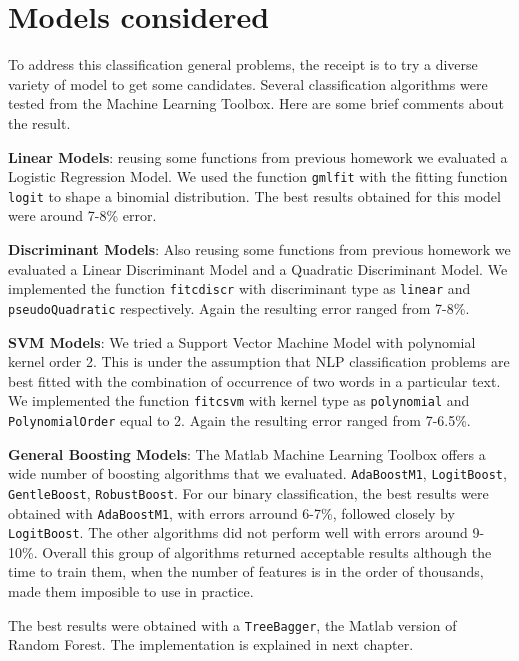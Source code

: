 \chapter{Models considered}
\label{ch:ch2models}

To address this classification general problems, the receipt is to try a diverse variety of model to get some candidates. Several classification algorithms were tested from the Machine Learning Toolbox. Here are some brief comments about the result.

\textbf{Linear Models}: reusing some functions from previous homework we evaluated a Logistic Regression Model. We used the function \verb|gmlfit| with the fitting function \verb|logit| to shape a binomial distribution.
The best results obtained for this model were around 7-8\% error.

\textbf{Discriminant Models}: Also reusing some functions from previous homework we evaluated a Linear Discriminant Model and a Quadratic Discriminant Model. We implemented the function \verb|fitcdiscr| with discriminant type as \verb|linear| and \verb|pseudoQuadratic| respectively. Again the resulting error ranged from 7-8\%.

\textbf{SVM Models}: We tried a Support Vector Machine Model with polynomial kernel order 2. This is under the assumption that NLP classification problems are best fitted with the combination of occurrence of two words in a particular text. We implemented the function \verb|fitcsvm| with kernel type as \verb|polynomial| and \verb|PolynomialOrder| equal to 2. Again the resulting error ranged from 7-6.5\%.

\textbf{General Boosting Models}: The Matlab Machine Learning Toolbox offers a wide number of boosting algorithms that we evaluated.
\verb|AdaBoostM1|, \verb|LogitBoost|, \verb|GentleBoost|, \verb|RobustBoost|. For our binary classification, the best results were obtained with \verb|AdaBoostM1|, with errors arround 6-7\%, followed closely by \verb|LogitBoost|. The other algorithms did not perform well with errors around 9-10\%. Overall this group of algorithms returned acceptable results although the time to train them, when the number of features is in the order of thousands, made them imposible to use in practice.  

The best results were obtained with a \verb|TreeBagger|, the Matlab version of Random Forest. The implementation is explained in next chapter.


